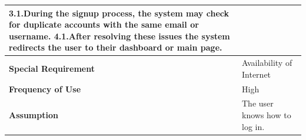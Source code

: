 \documentclass[12pt,a4paper]{article}
\begin{document}
\begin{table}[h!]
\begin{tabular}{|l|p{10cm}|}
\newline\textbf{3.1.}During the signup process, the system may check for duplicate accounts with the same email or username.
\newline\textbf{4.1.}After resolving these issues the system redirects the user to their dashboard or main page.\\ %
        \hline
       \textbf{Special Requirement}&Availability of Internet \\ %
        \hline
       \textbf{Frequency of Use}&High \\ %
        \hline
       \textbf{Assumption}&The user knows how to log in. \\ %
       \hline
    \end{tabular} 
    \end{table}


\clearpage
\end{document}
